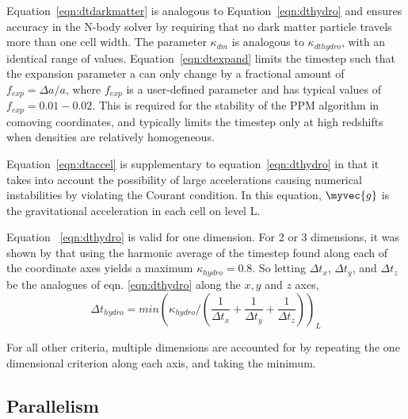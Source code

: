 Equation~\ref{eqn:dtdarkmatter} is analogous to Equation~\ref{eqn:dthydro} and ensures
accuracy in the N-body solver by requiring that no dark matter particle travels more than
one cell width.  The parameter $\kappa_{dm}$ is analogous to $\kappa_{dthydro}$, with
an identical range of values.  Equation~\ref{eqn:dtexpand} limits the timestep such 
that the expansion parameter a can only change by a fractional amount of $f_{exp} = \Delta a/a$, 
where $f_{exp}$ is a user-defined parameter and has typical values of $f_{exp} = 0.01-0.02$.
This is required for the stability of the PPM algorithm in comoving coordinates, and
typically limits the timestep only at high redshifts when densities are relatively
homogeneous.

Equation~\ref{eqn:dtaccel} is supplementary to equation~\ref{eqn:dthydro} in that it
takes into account the possibility of large accelerations causing numerical 
instabilities by violating the Courant condition.  In this equation, $\myvec{g}$ is the
gravitational acceleration in each cell on level L.  

Equation ~\ref{eqn:dthydro} is valid for one dimension.  For 2 or 3
dimensions, it was shown by \cite{Godunov1959}  that using the
harmonic average of the timestep found along each of the coordinate
axes yields a maximum $\kappa_{hydro} = 0.8$.  So letting $\Delta
t_x$, $\Delta t_y$, and $\Delta t_z$ be the analogues of
eqn. \ref{eqn:dthydro} along the $x,y$ and $z$ axes, 
\begin{equation}
\Delta t_{hydro} = min ( \kappa_{hydro} /( \frac{1}{\Delta t_x}
+\frac{1}{\Delta t_y} + \frac{1}{\Delta t_z} ) )_L
\end{equation}

For all other criteria, multiple dimensions are accounted for by
repeating the one dimensional criterion along each axis, and taking
the minimum.


\subsection{Parallelism}\label{sec.ov.parallel}

